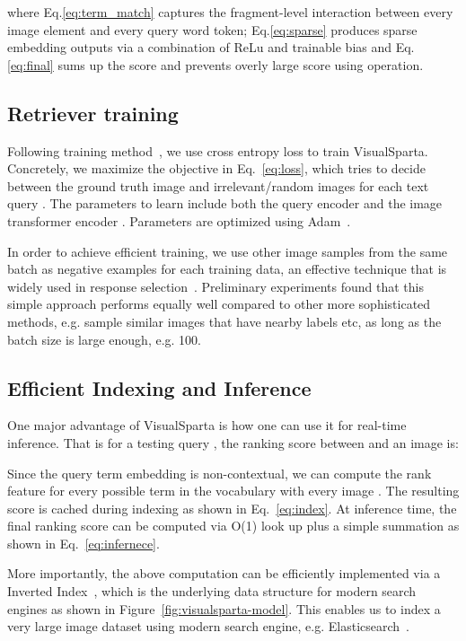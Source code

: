 \documentclass[11pt,a4paper]{article}
\begin{document}
where Eq.\ref{eq:term_match} captures the fragment-level interaction between every image element and every query word token; Eq.\ref{eq:sparse} produces sparse embedding outputs via a combination of ReLu and trainable bias and Eq.\ref{eq:final} sums up the score and prevents overly large score using  operation.

\subsection{Retriever training}
Following training method~\cite{zhao2020sparta}, we use cross entropy loss to train VisualSparta. Concretely, we maximize the objective in Eq.~\ref{eq:loss}, which tries to decide between the ground truth image  and irrelevant/random images  for each text query . The parameters to learn include both the query encoder  and the image transformer encoder . Parameters are optimized using Adam~\cite{kingma2014adam}.

In order to achieve efficient training, we use other image samples from the same batch as negative examples for each training data, an effective technique that is widely used in response selection~\cite{zhang2018personalizing,henderson2019convert}. Preliminary experiments found that this simple approach performs equally well compared to other more sophisticated methods, e.g. sample similar images that have nearby labels etc, as long as the batch size is large enough, e.g. 100. 

\subsection{Efficient Indexing and Inference}
\label{method:eff-index}
One major advantage of VisualSparta is how one can use it for real-time inference. That is for a testing query , the ranking score between  and an image is:

Since the query term embedding is non-contextual, we can compute the rank feature  for every possible term  in the vocabulary  with every image . The resulting score is cached during indexing as shown in Eq.~\ref{eq:index}. At inference time, the final ranking score can be computed via O(1) look up plus a simple summation as shown in Eq.~\ref{eq:infernece}.

More importantly, the above computation can be efficiently implemented via a Inverted Index~\cite{manning2008introduction}, which is the underlying data structure for modern search engines as shown in Figure~\ref{fig:visualsparta-model}. This enables us to index a very large image dataset using modern search engine, e.g. Elasticsearch~\cite{gheorghe2015elasticsearch}. 
\end{document}
